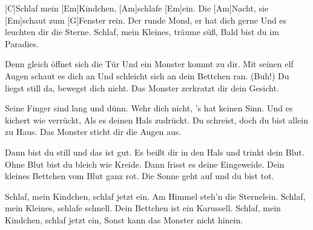 



\begin{guitar}
	[C]Schlaf mein [Em]Kindchen, [Am]schlafe [Em]ein.
	Die [Am]Nacht, sie [Em]schaut zum [G]Fenster rein.
	Der runde Mond, er hat dich gerne
	Und es leuchten dir die Sterne.
	Schlaf, mein Kleines, träume süß,
	Bald bist du im Paradies.
	
	Denn gleich öffnet sich die Tür
	Und ein Monster kommt zu dir.
	Mit seinen elf Augen schaut es dich an
	Und schleicht sich an dein Bettchen ran. (Buh!)
	Du liegst still da, bewegst dich nicht.
	Das Monster zerkratzt dir dein Gesicht.
	
	Seine Finger sind lang und dünn.
	Wehr dich nicht, 's hat keinen Sinn.
	Und es kichert wie verrückt,
	Als es deinen Hals zudrückt.
	Du schreist, doch du bist allein zu Haus.
	Das Monster sticht dir die Augen aus.
	
	\pagebreak
	Dann bist du still und das ist gut.
	Es beißt dir in den Hals und trinkt dein Blut.
	Ohne Blut bist du bleich wie Kreide.
	Dann frisst es deine Eingeweide.
	Dein kleines Bettchen vom Blut ganz rot.
	Die Sonne geht auf und du bist tot.
	
	Schlaf, mein Kindchen, schlaf jetzt ein.
	Am Himmel steh'n die Sternelein.
	Schlaf, mein Kleines, schlafe schnell.
	Dein Bettchen ist ein Karussell.
	Schlaf, mein Kindchen, schlaf jetzt ein,
	Sonst kann das Monster nicht hinein.
	
	
\end{guitar}